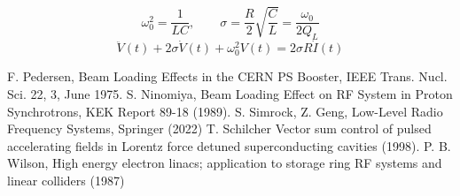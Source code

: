 \documentclass[book]{jlreq}
\begin{document}
%
\begin{equation}
    \omega_0^2 = \frac{1}{LC}, \qquad \sigma = \frac{R}{2}\sqrt{\frac{C}{L}} = \frac{\omega_0}{2Q_L}
\end{equation}
%
\begin{equation}
    \ddot{V}(t) + 2 \sigma \dot{V}(t) + \omega_0^2 V(t) = 2\sigma R \dot{I}(t)
\end{equation}
%
\begin{thebibliography}{9}
    F. Pedersen, Beam Loading Effects in the CERN PS Booster, IEEE Trans. Nucl. Sci. 22, 3, June 1975.
    S. Ninomiya, Beam Loading Effect on RF System in Proton Synchrotrons, KEK Report 89-18 (1989).
    S. Simrock, Z. Geng, Low-Level Radio Frequency Systems, Springer (2022)
    T. Schilcher Vector sum control of pulsed accelerating fields in Lorentz force detuned superconducting cavities (1998).
    P. B. Wilson, High energy electron linacs; application to storage ring RF systems and linear colliders (1987)
\end{thebibliography}
%
%
\end{document}

